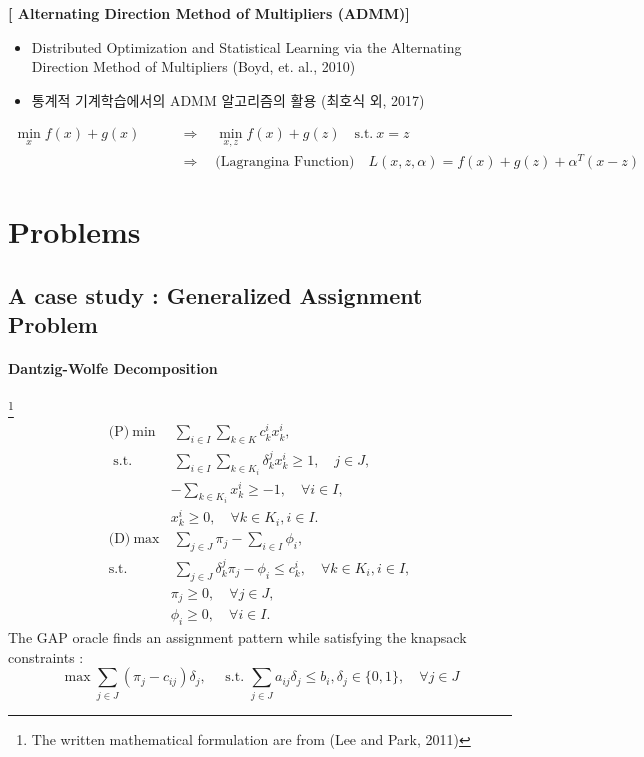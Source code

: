 \documentclass[12pt]{article}
\begin{document}
\vspace{5mm}
\textbf{[ Alternating Direction Method of Multipliers (ADMM)]}
\begin{itemize}
	\item Distributed Optimization and Statistical Learning via the Alternating Direction Method of Multipliers (Boyd, et. al., 2010)
	\item 통계적 기계학습에서의 ADMM 알고리즘의 활용 (최호식 외, 2017)
\end{itemize}
\begin{align*}
\min _ { x } f ( x ) + g ( x ) \qquad
&\Rightarrow \quad \min _ { x , z } f ( x ) + g ( z ) \quad \text{s.t.} ~ x = z \\
&\Rightarrow \quad \text{(Lagrangina Function)} \quad L ( x , z , \alpha ) = f ( x ) + g ( z ) + \alpha ^ { T } ( x - z ) 
\end{align*}

	\section{Problems}
	\subsection{A case study : Generalized Assignment Problem }
	\paragraph{Dantzig-Wolfe Decomposition}\footnote{\scriptsize{The written mathematical formulation are from (Lee and Park, 2011)}}
	\begin{align*}
\text{(P)}~ \min& ~ \sum _ { i \in I } \sum _ { k \in K } c _ { k } ^ { i } x _ { k } ^ { i },\\
	\text { s.t. }&  ~ \sum _ { i \in I } \sum _ { k \in K _ { i } } \delta _ { k } ^ { j } x _ { k } ^ { i } \geq 1 , \quad j \in J, \\
	&- \sum _ { k \in K _ { i } } x _ { k } ^ { i } \geq - 1 , \quad \forall i \in I ,\\
	&x _ { k } ^ { i } \geq 0 , \quad \forall k \in K _ { i } , i \in I .	\\[5mm]
 	\text{(D)}~   \max& ~ \sum _ { j \in J } \pi _ { j } - \sum _ { i \in I } \phi _ { i }, \\
	\text{s.t. } & ~ \sum _ { j \in J } \delta _ { k } ^ { j } \pi _ { j } - \phi _ { i } \leq c _ { k } ^ { i } , \quad \forall k \in K _ { i } , i \in I, \\
	&\pi _ { j } \geq 0 , \quad \forall j \in J ,\\
	&\phi _ { i } \geq 0 , \quad \forall i \in I. 
	\end{align*}
	The GAP oracle finds an assignment pattern while satisfying the knapsack constraints :
	 \begin{equation*}
	 \max \sum _ { j \in J } \left( \pi _ { j } - c _ { i j } \right) \delta _ { j } , \quad \text { s.t. } \sum _ { j \in J } a _ { i j } \delta _ { j } \leq b _ { i } , \delta _ { j } \in \{ 0,1 \} , \quad \forall j \in J
	 \end{equation*}
\end{document}

